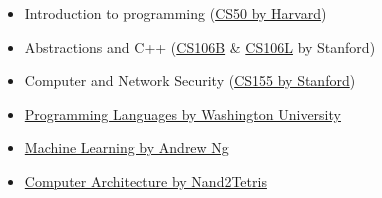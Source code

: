 \documentclass[10pt,a4paper]{../altacv}
\begin{document}

\begin{itemize}
	\item Introduction to programming (\href{https://cs50.harvard.edu/}{CS50 by Harvard})
	\item Abstractions and C++ (\href{https://web.stanford.edu/class/cs106b/}{CS106B} \& \href{http://web.stanford.edu/class/cs106l/index.html}{CS106L} by Stanford)
	\item Computer and Network Security (\href{https://crypto.stanford.edu/cs155/}{CS155 by Stanford})
\end{itemize}

\divider

\begin{itemize}
	\item \href{https://www.coursera.org/instructor/~873260}{Programming Languages by Washington University}
	\item \href{https://www.coursera.org/learn/machine-learning}{Machine Learning by Andrew Ng}
	\item \href{http://nand2tetris.org/}{Computer Architecture by Nand2Tetris}
\end{itemize}

\medskip










\end{document}
